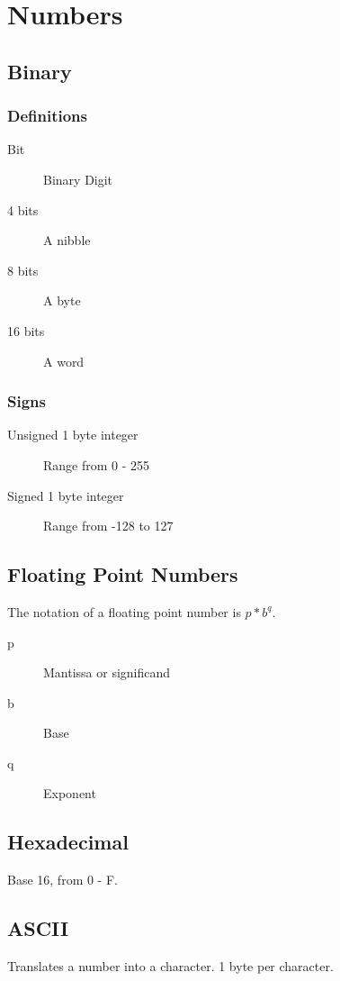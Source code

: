 \section{Numbers}
	\subsection{Binary}
		\subsubsection{Definitions}
			\begin{description}
				\item[Bit] Binary Digit
				\item[4 bits] A nibble
				\item[8 bits] A byte
				\item[16 bits] A word
			\end{description}
			
		\subsubsection{Signs}
			\begin{description}
				\item[Unsigned 1 byte integer] Range from 0 - 255
				\item[Signed 1 byte integer] Range from -128 to 127
			\end{description}
			
		\subsection{Floating Point Numbers}
			The notation of a floating point number is $p*b^q$.
			\begin{description}
				\item[p] Mantissa or significand
				\item[b] Base
				\item[q] Exponent
			\end{description}
		
	\subsection{Hexadecimal}
		Base 16, from 0 - F.
	
	\subsection{ASCII}
		Translates a number into a character.
		1 byte per character.
	
